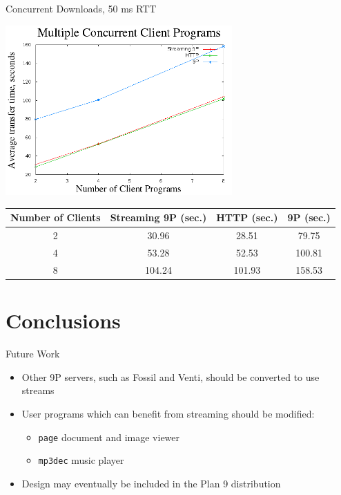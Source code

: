 \documentclass[11pt,compress]{beamer}
\begin{document}
\begin{frame}{Concurrent Downloads, 50 ms RTT}
\begin{center}
	\includegraphics[width=0.65\textwidth]{concurrent.png}
	\scriptsize{
	\begin{table}
		\begin{center}
		\begin{tabular}{ | c || c | c | c |}
			\hline
			\bf{Number of Clients} & \bf{Streaming 9P (sec.)} & \bf{HTTP (sec.)} & \bf{9P (sec.)} \\ \hline
			2 & 30.96 & 28.51 & 79.75 \\ \hline
			4 & 53.28 & 52.53 & 100.81 \\ \hline
			8 & 104.24 & 101.93 & 158.53 \\ \hline
		\end{tabular}
		\end{center}
	\end{table}
	}
\end{center}
\end{frame}

\section{Conclusions}

\begin{frame}{Future Work}
\begin{itemize}
	\item Other 9P servers, such as Fossil and Venti, should be converted to use streams
	\item User programs which can benefit from streaming should be modified:
	\begin{itemize}
		\item {\tt page} document and image viewer
		\item {\tt mp3dec} music player
	\end{itemize}
	\item Design may eventually be included in the Plan 9 distribution
\end{itemize}
\end{frame}
\end{document}
